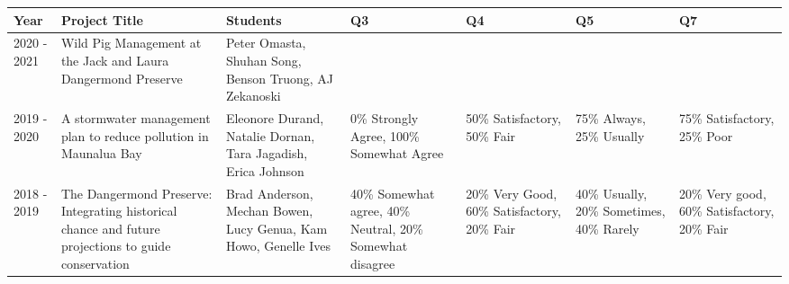 
\begin{longtable}{p{1cm}p{2.5cm}p{3cm}p{2cm}p{2cm}p{2cm}p{2cm}}
Year & Project Title & Students & Q3 & Q4 & Q5 & Q7\\
\hline 
\endhead 
2020 - 2021 & Wild Pig Management at the Jack and Laura Dangermond Preserve & Peter Omasta, Shuhan Song, Benson Truong, AJ Zekanoski &  &  &  &  \\ 
2019 - 2020 & A stormwater management plan to reduce pollution in Maunalua Bay & Eleonore Durand, Natalie Dornan, Tara Jagadish, Erica Johnson & 0\% Strongly Agree, 100\% Somewhat Agree & 50\% Satisfactory, 50\% Fair & 75\% Always, 25\% Usually & 75\% Satisfactory, 25\% Poor \\ 
2018 - 2019 & The Dangermond Preserve: Integrating historical chance and future projections to guide conservation & Brad Anderson, Mechan Bowen, Lucy Genua, Kam Howo, Genelle Ives & 40\% Somewhat agree, 40\% Neutral, 20\% Somewhat disagree & 20\% Very Good, 60\% Satisfactory, 20\% Fair & 40\% Usually, 20\% Sometimes, 40\% Rarely & 20\% Very good, 60\% Satisfactory, 20\% Fair \\ 
\end{longtable}

